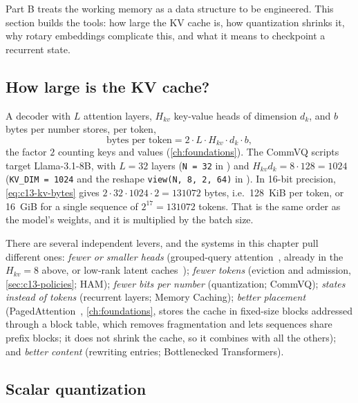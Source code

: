 Part B treats the working memory as a data structure to be engineered. This section builds the tools:
how large the KV cache is, how quantization shrinks it, why rotary embeddings complicate this, and
what it means to checkpoint a recurrent state.

\subsection{How large is the KV cache?}\label{sec:c13-kvsize}

A decoder with $L$ attention layers, $H_{kv}$ key-value heads of dimension $d_k$, and $b$ bytes per
number stores, per token,
\begin{equation}\label{eq:c13-kv-bytes}
  \text{bytes per token} = 2\cdot L\cdot H_{kv}\cdot d_k\cdot b ,
\end{equation}
the factor $2$ counting keys and values (\cref{ch:foundations}). The CommVQ scripts target
Llama-3.1-8B, with $L=32$ layers (\texttt{N = 32} in )
and $H_{kv}d_k=8\cdot128=1024$ (\texttt{KV\_DIM = 1024} and the reshape \texttt{view(N, 8, 2, 64)} in
). In 16-bit precision,
\eqref{eq:c13-kv-bytes} gives $2\cdot32\cdot1024\cdot2=131072$ bytes, i.e.\ 128~KiB per token, or 16~GiB
for a single sequence of $2^{17}=131072$ tokens. That is the same order as the model's weights, and it
is multiplied by the batch size.

There are several independent levers, and the systems in this chapter pull different ones:
\emph{fewer or smaller heads} (grouped-query attention~\citep{c01-ainslie2023gqa}, already in the
$H_{kv}=8$ above, or low-rank latent caches~\citep{deepseek2024v2}); \emph{fewer tokens} (eviction and
admission, \cref{sec:c13-policies}; HAM); \emph{fewer bits per number} (quantization; CommVQ);
\emph{states instead of tokens} (recurrent layers; Memory Caching); \emph{better placement}
(PagedAttention~\citep{kwon2023paged}, \cref{ch:foundations}, stores the cache in fixed-size blocks
addressed through a block table, which removes fragmentation and lets sequences share prefix blocks; it
does not shrink the cache, so it combines with all the others); and \emph{better content} (rewriting
entries; Bottlenecked Transformers).

\subsection{Scalar quantization}\label{sec:c13-sq}

